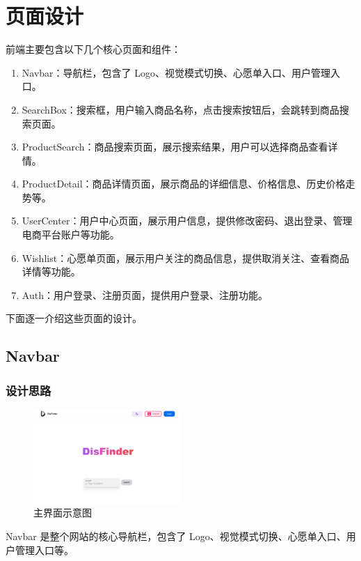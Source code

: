 \section{页面设计}

前端主要包含以下几个核心页面和组件：

\begin{enumerate}
  \item Navbar：导航栏，包含了 Logo、视觉模式切换、心愿单入口、用户管理入口。
  \item SearchBox：搜索框，用户输入商品名称，点击搜索按钮后，会跳转到商品搜索页面。
  \item ProductSearch：商品搜索页面，展示搜索结果，用户可以选择商品查看详情。
  \item ProductDetail：商品详情页面，展示商品的详细信息、价格信息、历史价格走势等。
  \item UserCenter：用户中心页面，展示用户信息，提供修改密码、退出登录、管理电商平台账户等功能。
  \item Wishlist：心愿单页面，展示用户关注的商品信息，提供取消关注、查看商品详情等功能。
  \item Auth：用户登录、注册页面，提供用户登录、注册功能。
\end{enumerate}

下面逐一介绍这些页面的设计。

\subsection{Navbar}

\subsubsection{设计思路}

\begin{figure}[H]
\centering
\includegraphics[width=0.5\textwidth]{assets/report/homepage.png}
\caption{主界面示意图}
\end{figure}

Navbar 是整个网站的核心导航栏，包含了 Logo、视觉模式切换、心愿单入口、用户管理入口等。

